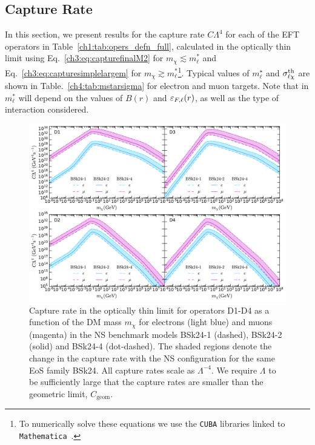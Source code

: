 \subsection{Capture Rate}
\label{ch4:subsec:caprateresults}

In this section, we present results for the capture rate $C\Lambda^4$ for each of the EFT operators in Table~\ref{ch1:tab:opers_defn_full}, calculated in the optically thin limit using Eq.~\ref{ch3:eq:capturefinalM2} for $m_\chi\lesssim m_\ell^*$ and  Eq.~\ref{ch3:eq:capturesimplelargem} for $m_\chi\gtrsim m_\ell^*$\footnote{To numerically solve these equations we use the \texttt{CUBA} libraries \cite{Hahn:2004fe_CUBALibrarymultidimensional, Hahn:2014fua_Concurrentcuba} linked to \texttt{Mathematica}~\cite{Mathematica}.}. Typical values of $m_\ell^\star$ and $\sigma^{\rm th}_{\ell\chi}$ are shown in Table.~\ref{ch4:tab:mstarsigma} for electron and muon targets. Note that in $m_\ell^*$ will depend on the values of $B(r)$ and $\varepsilon_{F,\ell}(r)$, as well as the type of interaction considered. 

\begin{figure}[t] 
    \centering
    \includegraphics[width=\textwidth]{capture_2/D1_D4_C_mDM_lept.pdf}
    \caption{Capture rate in the optically thin limit for operators D1-D4 as a function of the DM mass $m_\chi$ for electrons (light blue) and muons (magenta) in the NS benchmark models BSk24-1 (dashed), BSk24-2 (solid) and BSk24-4 (dot-dashed). The shaded regions denote the change in the capture rate with the NS configuration for the same EoS family BSk24. 
    All capture rates scale as $\Lambda^{-4}$. We require $\Lambda$ to be sufficiently large that the capture rates are smaller than the geometric limit, $C_\mathrm{geom}$. 
    }
    \label{ch4:fig:capratesD1D4}
    \end{figure} 
    
